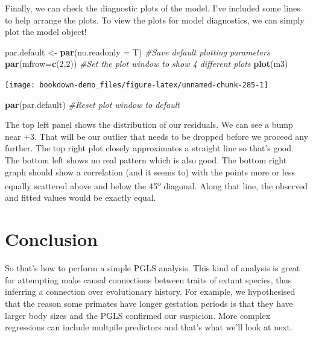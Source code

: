 \documentclass[
]{book}
\newenvironment{Shaded}{\begin{snugshade}}{\end{snugshade}}
\newcommand{\CommentTok}[1]{\textcolor[rgb]{0.56,0.35,0.01}{\textit{#1}}}
\newcommand{\DataTypeTok}[1]{\textcolor[rgb]{0.13,0.29,0.53}{#1}}
\newcommand{\DecValTok}[1]{\textcolor[rgb]{0.00,0.00,0.81}{#1}}
\newcommand{\KeywordTok}[1]{\textcolor[rgb]{0.13,0.29,0.53}{\textbf{#1}}}
\newcommand{\NormalTok}[1]{#1}
\newcommand{\StringTok}[1]{\textcolor[rgb]{0.31,0.60,0.02}{#1}}
\begin{document}
Finally, we can check the diagnostic plots of the model. I've included some lines to help arrange the plots. To view the plots for model diagnostics, we can simply plot the model object!

\begin{Shaded}
\begin{Highlighting}[]
\NormalTok{par.default \textless{}{-}}\StringTok{ }\KeywordTok{par}\NormalTok{(}\DataTypeTok{no.readonly =}\NormalTok{ T) }\CommentTok{\#Save default plotting parameters}
\KeywordTok{par}\NormalTok{(}\DataTypeTok{mfrow=}\KeywordTok{c}\NormalTok{(}\DecValTok{2}\NormalTok{,}\DecValTok{2}\NormalTok{)) }\CommentTok{\#Set the plot window to show 4 different plots}
\KeywordTok{plot}\NormalTok{(m3)}
\end{Highlighting}
\end{Shaded}

\begin{center}\texttt{[image: bookdown-demo\_files/figure-latex/unnamed-chunk-285-1]} \end{center}

\begin{Shaded}
\begin{Highlighting}[]
\KeywordTok{par}\NormalTok{(par.default) }\CommentTok{\#Reset plot window to default}
\end{Highlighting}
\end{Shaded}

The top left panel shows the distribution of our residuals. We can see a bump near +3. That will be our outlier that needs to be dropped before we proceed any further. The top right plot closely approximates a straight line so that's good. The bottom left shows no real pattern which is also good. The bottom right graph should show a correlation (and it seems to) with the points more or less equally scattered above and below the 45\textsuperscript{o} diagonal. Along that line, the observed and fitted values would be exactly equal.

\hypertarget{conclusion}{%
\section{Conclusion}\label{conclusion}}

So that's how to perform a simple PGLS analysis. This kind of analysis is great for attempting make causal connections between traits of extant species, thus inferring a connection over evolutionary history. For example, we hypothesised that the reason some primates have longer gestation periods is that they have larger body sizes and the PGLS confirmed our suspicion. More complex regressions can include multpile predictors and that's what we'll look at next.
\end{document}
